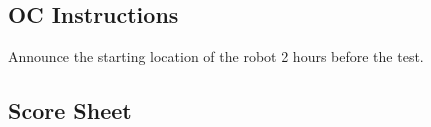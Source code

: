 \subsection*{OC Instructions}
Announce the starting location of the robot 2 hours before the test.

\subsection*{Score Sheet}

